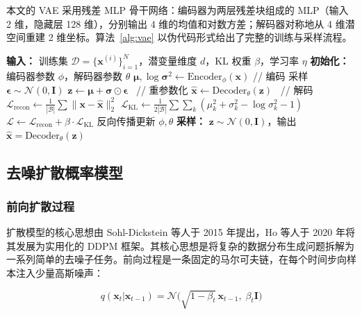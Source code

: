 \documentclass[UTF8,a4paper,12pt]{ctexart}
\newcommand{\Ncal}{\mathcal{N}}
\begin{document}
本文的 VAE 采用残差 MLP 骨干网络：编码器为两层残差块组成的 MLP（输入 2 维，隐藏层 128 维），分别输出 4 维的均值和对数方差；解码器对称地从 4 维潜空间重建 2 维坐标。算法~\ref{alg:vae} 以伪代码形式给出了完整的训练与采样流程。

\begin{algorithm}[H]
\centering
\caption{变分自编码器的训练与采样}
\label{alg:vae}
\begin{algorithmic}[1]
\State \textbf{输入：} 训练集 $\mathcal{D}=\{\mathbf{x}^{(i)}\}_{i=1}^{N}$，潜变量维度 $d$，KL 权重 $\beta$，学习率 $\eta$
\State \textbf{初始化：} 编码器参数 $\phi$，解码器参数 $\theta$
        \State $\boldsymbol{\mu},\log\boldsymbol{\sigma}^2 \gets \text{Encoder}_{\phi}(\mathbf{x})$ \qquad // 编码
        \State 采样 $\boldsymbol{\epsilon}\sim\Ncal(0,\mathbf{I})$
        \State $\mathbf{z} \gets \boldsymbol{\mu} + \boldsymbol{\sigma}\odot\boldsymbol{\epsilon}$ \qquad\qquad\;\, // 重参数化
        \State $\hat{\mathbf{x}} \gets \text{Decoder}_{\theta}(\mathbf{z})$ \qquad\qquad\;\, // 解码
        \State $\mathcal{L}_{\text{recon}} \gets \frac{1}{|\mathcal{B}|}\sum\|\mathbf{x}-\hat{\mathbf{x}}\|_2^2$
        \State $\mathcal{L}_{\text{KL}} \gets \frac{1}{2|\mathcal{B}|}\sum\sum_k(\mu_k^2+\sigma_k^2-\log\sigma_k^2-1)$
        \State $\mathcal{L} \gets \mathcal{L}_{\text{recon}} + \beta\cdot\mathcal{L}_{\text{KL}}$
        \State 反向传播更新 $\phi,\theta$
    \EndFor
\EndFor
\State \textbf{采样：} $\mathbf{z}\sim\Ncal(0,\mathbf{I})$，输出 $\hat{\mathbf{x}}=\text{Decoder}_{\theta}(\mathbf{z})$
\end{algorithmic}
\end{algorithm}

\subsection{去噪扩散概率模型}

\subsubsection{前向扩散过程}

扩散模型的核心思想由 Sohl-Dickstein 等人于 2015 年提出，Ho 等人\cite{ho2020ddpm}于 2020 年将其发展为实用化的 DDPM 框架。其核心思想是将复杂的数据分布生成问题拆解为一系列简单的去噪子任务。前向过程是一条固定的马尔可夫链，在每个时间步向样本注入少量高斯噪声：

\begin{equation}
    q(\mathbf{x}_t|\mathbf{x}_{t-1}) = \Ncal\bigl(\sqrt{1-\beta_t}\,\mathbf{x}_{t-1},\;\beta_t\mathbf{I}\bigr)
\end{equation}
\end{document}
